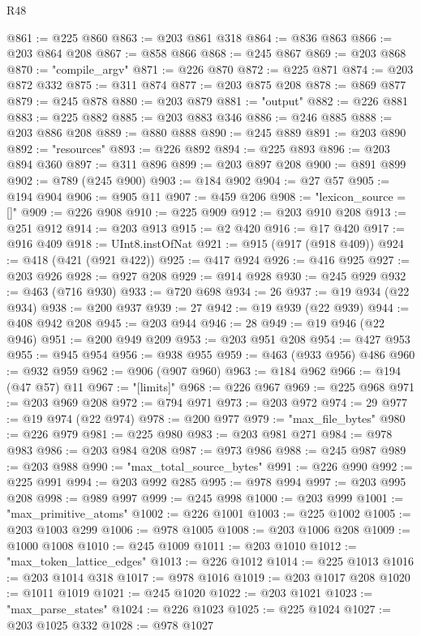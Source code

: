\begin{lexlean}{R48}
\begin{coremodule}
@861 := @225 @860
@863 := @203 @861 @318
@864 := @836 @863
@866 := @203 @864 @208
@867 := @858 @866
@868 := @245 @867
@869 := @203 @868
@870 := "compile_argv"
@871 := @226 @870
@872 := @225 @871
@874 := @203 @872 @332
@875 := @311 @874
@877 := @203 @875 @208
@878 := @869 @877
@879 := @245 @878
@880 := @203 @879
@881 := "output"
@882 := @226 @881
@883 := @225 @882
@885 := @203 @883 @346
@886 := @246 @885
@888 := @203 @886 @208
@889 := @880 @888
@890 := @245 @889
@891 := @203 @890
@892 := "resources"
@893 := @226 @892
@894 := @225 @893
@896 := @203 @894 @360
@897 := @311 @896
@899 := @203 @897 @208
@900 := @891 @899
@902 := @789 (@245 @900)
@903 := @184 @902
@904 := @27 @57
@905 := @194 @904
@906 := @905 @11
@907 := @459 @206
@908 := "lexicon_source = []"
@909 := @226 @908
@910 := @225 @909
@912 := @203 @910 @208
@913 := @251 @912
@914 := @203 @913
@915 := @2 @420
@916 := @17 @420
@917 := @916 @409
@918 := UInt8.instOfNat
@921 := @915 (@917 (@918 @409))
@924 := @418 (@421 (@921 @422))
@925 := @417 @924
@926 := @416 @925
@927 := @203 @926
@928 := @927 @208
@929 := @914 @928
@930 := @245 @929
@932 := @463 (@716 @930)
@933 := @720 @698
@934 := 26
@937 := @19 @934 (@22 @934)
@938 := @200 @937
@939 := 27
@942 := @19 @939 (@22 @939)
@944 := @408 @942 @208
@945 := @203 @944
@946 := 28
@949 := @19 @946 (@22 @946)
@951 := @200 @949 @209
@953 := @203 @951 @208
@954 := @427 @953
@955 := @945 @954
@956 := @938 @955
@959 := @463 (@933 @956) @486
@960 := @932 @959
@962 := @906 (@907 @960)
@963 := @184 @962
@966 := @194 (@47 @57) @11
@967 := "[limits]"
@968 := @226 @967
@969 := @225 @968
@971 := @203 @969 @208
@972 := @794 @971
@973 := @203 @972
@974 := 29
@977 := @19 @974 (@22 @974)
@978 := @200 @977
@979 := "max_file_bytes"
@980 := @226 @979
@981 := @225 @980
@983 := @203 @981 @271
@984 := @978 @983
@986 := @203 @984 @208
@987 := @973 @986
@988 := @245 @987
@989 := @203 @988
@990 := "max_total_source_bytes"
@991 := @226 @990
@992 := @225 @991
@994 := @203 @992 @285
@995 := @978 @994
@997 := @203 @995 @208
@998 := @989 @997
@999 := @245 @998
@1000 := @203 @999
@1001 := "max_primitive_atoms"
@1002 := @226 @1001
@1003 := @225 @1002
@1005 := @203 @1003 @299
@1006 := @978 @1005
@1008 := @203 @1006 @208
@1009 := @1000 @1008
@1010 := @245 @1009
@1011 := @203 @1010
@1012 := "max_token_lattice_edges"
@1013 := @226 @1012
@1014 := @225 @1013
@1016 := @203 @1014 @318
@1017 := @978 @1016
@1019 := @203 @1017 @208
@1020 := @1011 @1019
@1021 := @245 @1020
@1022 := @203 @1021
@1023 := "max_parse_states"
@1024 := @226 @1023
@1025 := @225 @1024
@1027 := @203 @1025 @332
@1028 := @978 @1027

\end{coremodule}
\end{lexlean}
